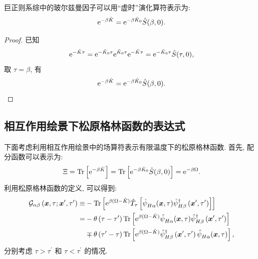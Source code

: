 巨正则系综中的玻尔兹曼因子可以用“虚时”演化算符表示为:
\begin{equation}
\mathrm{e}^{-\beta \hat{K}}=\mathrm{e}^{-\beta \hat{K}_0} \hat{S}(\beta, 0).
\end{equation}
\begin{proof}
已知
\begin{equation}
\mathrm{e}^{-\hat{K}\tau}=\mathrm{e}^{-\hat{K}_0\tau}\mathrm{e}^{\hat{K}_0\tau}\mathrm{e}^{-\hat{K}\tau}=\mathrm{e}^{-\hat{K}_0 \tau} \hat{S}(\tau, 0),
\end{equation}
取 $\tau=\beta$, 有
\begin{equation}
\mathrm{e}^{-\beta \hat{K}}=\mathrm{e}^{-\beta \hat{K}_0} \hat{S}(\beta, 0).
\end{equation}
\end{proof}


\subsection{相互作用绘景下松原格林函数的表达式}
下面考虑利用相互作用绘景中的场算符表示有限温度下的松原格林函数. 首先, 配分函数可以表示为:
\begin{equation}
\Xi=\operatorname{Tr}\left[\mathrm{e}^{-\beta \hat{K}}\right]=\operatorname{Tr}\left[\mathrm{e}^{-\beta \hat{K}_0} \hat{S}(\beta, 0)\right]=\mathrm{e}^{-\beta \Omega}.
\end{equation}
利用松原格林函数的定义, 可以得到:
\begin{align}
\mathcal{G}_{\alpha \beta}\left(\boldsymbol{x}, \tau ; \boldsymbol{x}^{\prime}, \tau^{\prime}\right) \equiv & -\operatorname{Tr}\left[\mathrm{e}^{\beta(\Omega-\hat{K})} \hat{T}_\tau\left[\hat{\psi}^{}_{H \alpha}(\boldsymbol{x}, \tau) \hat{\psi}_{H \beta}^{\dagger}\left(\boldsymbol{x}^{\prime}, \tau^{\prime}\right)\right]\right] \nonumber\\
= & -\theta\left(\tau-\tau^{\prime}\right) \operatorname{Tr}\left[\mathrm{e}^{\beta(\Omega-\hat{K})} \hat{\psi}^{}_{H \alpha}(\boldsymbol{x}, \tau) \hat{\psi}_{H \beta}^{\dagger}\left(\boldsymbol{x}^{\prime}, \tau^{\prime}\right)\right] \nonumber\\
& \mp \theta\left(\tau^{\prime}-\tau\right) \operatorname{Tr}\left[\mathrm{e}^{\beta(\Omega-\hat{K})} \hat{\psi}_{H \beta}^{\dagger}\left(\boldsymbol{x}^{\prime}, \tau^{\prime}\right) \hat{\psi}^{}_{H \alpha}(\boldsymbol{x}, \tau)\right],
\end{align}
分别考虑 $\tau>\tau^{\prime}$ 和 $\tau<\tau^{\prime}$ 的情况.

